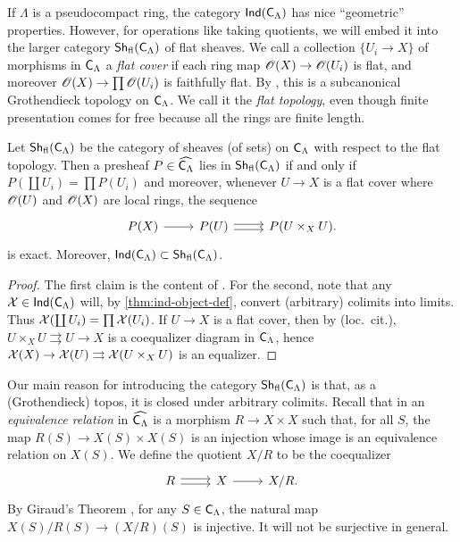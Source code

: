 \documentclass[phd,cornellheadings,draft]{cornell}
\begin{document}
If $\Lambda$ is a pseudocompact ring, the category 
$\operatorname{\mathsf{Ind}}(\mathsf{C}_\Lambda)$ has nice ``geometric'' properties. However, 
for operations like taking quotients, we will embed it into the larger category 
$\operatorname{\mathsf{Sh}}_{\mathrm{fl}}(\mathsf{C}_\Lambda)$ of flat sheaves. We call a collection 
$\{U_i\to X\}$ of morphisms in $\mathsf{C}_\Lambda$ a \emph{flat cover} if each 
ring map $\mathscr{O}(X)\to \mathscr{O}(U_i)$ is flat, and moreover 
$\mathscr{O}(X)\to \prod \mathscr{O}(U_i)$ is faithfully flat. By \cite[IV 6.3.1]{sga3-1}, this 
is a subcanonical Grothendieck topology on $\mathsf{C}_\Lambda$. We call it the 
\emph{flat topology}, even though finite presentation comes for free because 
all the rings are finite length. 

\begin{lemma}
Let $\operatorname{\mathsf{Sh}}_{\mathrm{fl}}(\mathsf{C}_\Lambda)$ be the category of sheaves (of sets) on 
$\mathsf{C}_\Lambda$ with respect to the flat topology. Then a presheaf 
$P\in \widehat{\mathsf{C}_\Lambda}$ lies in $\operatorname{\mathsf{Sh}}_{\mathrm{fl}}(\mathsf{C}_\Lambda)$ if 
and only if $P(\coprod U_i) = \prod P(U_i)$ and moreover, whenever 
$U \to X$ is a flat cover where $\mathscr{O}(U)$ and $\mathscr{O}(X)$ are local rings, the 
sequence 
\[
\begin{tikzcd}
	P(X) \ar[r]
		& P(U) \ar[r, shift left=.5ex] \ar[r, shift right=.5ex]
		& P(U\times_X U) .
\end{tikzcd}
\]
is exact. Moreover, 
$\operatorname{\mathsf{Ind}}(\mathsf{C}_\Lambda)\subset \operatorname{\mathsf{Sh}}_{\mathrm{fl}}(\mathsf{C}_\Lambda)$. 
\end{lemma}
\begin{proof}
The first claim is the content of \cite[IV 6.3.1(ii)]{sga3-1}. For the second, 
note that any $\mathcal{X}\in \operatorname{\mathsf{Ind}}(\mathsf{C}_\Lambda)$ will, by 
\ref{thm:ind-object-def}, convert (arbitrary) colimits into limits. Thus 
$\mathcal{X}(\coprod U_i) = \prod \mathcal{X}(U_i)$. If $U\to X$ is a flat cover, then by (loc.~cit.), $U\times_X U\rightrightarrows U\to X$ is a coequalizer diagram in 
$\mathsf{C}_\Lambda$, hence 
$\mathcal{X}(X)\to \mathcal{X}(U)\rightrightarrows \mathcal{X}(U\times_X U)$ is an equalizer. 
\end{proof}

Our main reason for introducing the category $\operatorname{\mathsf{Sh}}_{\mathrm{fl}}(\mathsf{C}_\Lambda)$ 
is that, as a (Grothendieck) topos, it is closed under arbitrary colimits. 
Recall that in an \emph{equivalence relation} in $\widehat{\mathsf{C}_\Lambda}$ 
is a morphism $R\to X\times X$ such that, for all $S$, the map 
$R(S)\to X(S)\times X(S)$ is an injection whose image is an equivalence 
relation on $X(S)$. We define the quotient $X/R$ to be the coequalizer 
\[
\begin{tikzcd}
	R \ar[r, shift left=.5ex] \ar[r, shift right=.5ex]
		& X \ar[r]
		& X/R .
\end{tikzcd}
\]
By Giraud's Theorem \cite[App.]{maclane-moerdijk-1994}, for any 
$S\in \mathsf{C}_\Lambda$, the natural map $X(S)/R(S)\to (X/R)(S)$ is injective. 
It will not be surjective in general. 
\end{document}
